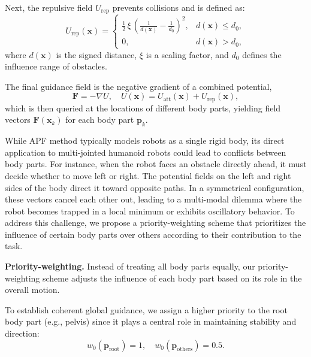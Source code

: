 Next, the repulsive field $U_{\text{rep}}$ prevents collisions and is defined as:
\begin{equation}
U_{\text{rep}}(\mathbf{x}) =
\begin{cases}
\frac{1}{2}\,\xi\,\left(\frac{1}{d(\mathbf{x})} - \frac{1}{d_0}\right)^2, & d(\mathbf{x}) \le d_0, \\[6pt]
0, & d(\mathbf{x}) > d_0,
\end{cases}
\end{equation}
where $d(\mathbf{x})$ is the signed distance, $\xi$ is a scaling factor, and $d_0$ defines the influence range of obstacles. 

The final guidance field is the negative gradient of a combined potential,
\begin{equation}
\mathbf{F} = -\nabla U,\quad
U(\mathbf{x}) = U_{\text{att}}(\mathbf{x}) + U_{\text{rep}}(\mathbf{x}),
\label{eq:field_direction}
\end{equation}
which is then queried at the locations of different body parts, yielding field vectors $\mathbf{F}(\mathbf{x}_k)$ for each body part $\mathbf{p}_k$.



While APF method typically models robots as a single rigid body, its direct application to multi-jointed humanoid robots could lead to conflicts between body parts. For instance, when the robot faces an obstacle directly ahead, it must decide whether to move left or right. The potential fields on the left and right sides of the body direct it toward opposite paths. In a symmetrical configuration, these vectors cancel each other out, leading to a multi-modal dilemma where the robot becomes trapped in a local minimum or exhibits oscillatory behavior. To address this challenge, we propose a priority-weighting scheme that prioritizes the influence of certain body parts over others according to their contribution to the task.



\textbf{Priority-weighting.} Instead of treating all body parts equally, our priority-weighting scheme adjusts the influence of each body part based on its role in the overall motion.

To establish coherent global guidance, we assign a higher priority to the root body part (e.g., pelvis) since it plays a central role in maintaining stability and direction:
\begin{equation}
w_0(\mathbf{p}_{\text{root}}) = 1,\quad 
w_0(\mathbf{p}_{\text{others}}) = 0.5.
\end{equation}

